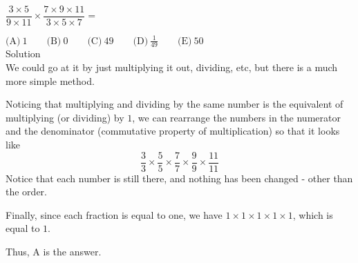 

$\dfrac{3\times 5}{9\times 11}\times \dfrac{7\times 9\times 11}{3\times 5\times 7}=$

$\text{(A)}\ 1 \qquad \text{(B)}\ 0 \qquad \text{(C)}\ 49 \qquad \text{(D)}\ \frac{1}{49} \qquad \text{(E)}\ 50$
\\
Solution
\\
We could go at it by just multiplying it out, dividing, etc, but there is a much more simple method.

Noticing that multiplying and dividing by the same number is the equivalent of multiplying (or dividing) by $1$, we can rearrange the numbers in the numerator and the denominator (commutative property of multiplication) so that it looks like \[\frac{3}{3} \times \frac{5}{5} \times \frac{7}{7} \times \frac{9}{9} \times \frac{11}{11}\]
Notice that each number is still there, and nothing has been changed - other than the order.

Finally, since each fraction is equal to one, we have $1\times1\times1\times1\times1$, which is equal to $1$.

Thus, $\boxed{\text{A}}$ is the answer.
